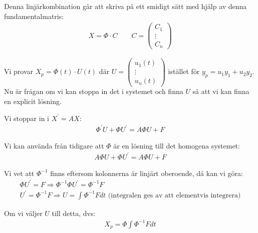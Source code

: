 \noindent Denna linjärkombination går att skriva på ett smidigt sätt med hjälp av denna fundamentalmatris:
\begin{equation*}
  \begin{gathered}
    X = \Phi\cdot C\qquad C= \begin{pmatrix}C_1\\\vdots\\C_n\end{pmatrix}
  \end{gathered}
\end{equation*}
\par\bigskip
\noindent Vi provar $X_p = \Phi(t)\cdot U(t)$ där $U=\begin{pmatrix}u_1(t)\\\vdots\\u_n(t)\end{pmatrix}$ istället för $y_p = u_1y_1+u_2y_2$. Nu är frågan om vi kan stoppa in det i systemet och finna $U$ så att vi kan finna en explicit lösning.\par
\noindent Vi stoppar in i $X^{\prime} = AX$:
\begin{equation*}
  \begin{gathered}
    \Phi^{\prime}U+\Phi U^{\prime} = A\Phi U + F
  \end{gathered}
\end{equation*}
\par\bigskip
\noindent Vi kan använda från tidigare att $\Phi$ är en lösning till det homogena systemet:
\begin{equation*}
  \begin{gathered}
    A\Phi U +\Phi U^{\prime} = A\Phi U+F
  \end{gathered}
\end{equation*}\par
\noindent Vi vet att $\Phi^{-1}$ finns eftersom kolonnerna är linjärt oberoende, då kan vi göra:
\begin{equation*}
  \begin{gathered}
    \Phi U^{\prime} = F \Rightarrow \Phi^{-1}\Phi U^{\prime} = \Phi^{-1}F\\
    U^{\prime} = \Phi^{-1}F\Rightarrow U = \int\Phi^{-1}F dt \text{ (integralen ges av att elementvis integrera)}
  \end{gathered}
\end{equation*}
\par\bigskip
\noindent Om vi väljer $U$ till detta, dvs:
\begin{equation*}
  \begin{gathered}
    X_p = \Phi\int\Phi^{-1}F dt
  \end{gathered}
\end{equation*}\par
